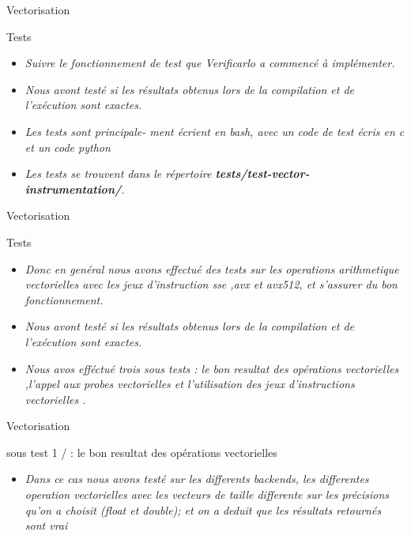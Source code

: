 \documentclass{beamer}
\begin{document}
\begin{frame}{Vectorisation}
\begin{block}{Tests}
    \begin{itemize}
        \item\textit{ Suivre le fonctionnement de test que
Verificarlo a commencé à implémenter. } 
         \item\textit{Nous avont testé si les résultats obtenus lors de la compilation et de l’exécution sont exactes.} 
        
         \item \textit{Les tests sont principale-
ment écrient en bash, avec un code de test écris en c et un code python}  
         \item \textit{Les tests se trouvent dans
le répertoire \textbf{ tests/test-vector-instrumentation/}.} 
         \end{itemize}  
\end{block}
\end{frame}


\begin{frame}{Vectorisation}
\begin{block}{Tests}
      \begin{itemize}
        \item\textit{Donc en genéral nous avons effectué des tests sur les operations arithmetique vectorielles avec les jeux d'instruction sse ,avx et avx512, et s'assurer du bon fonctionnement. } 
         \item\textit{Nous avont testé si les résultats obtenus lors de la compilation et de l’exécution sont exactes.} 
        
         \item \textit{Nous avos efféctué trois sous tests : le bon resultat des opérations vectorielles ,l'appel aux probes vectorielles et l'utilisation des jeux d'instructions vectorielles .}  
         
         \end{itemize}
\end{block}


         \end{frame}
\begin{frame}{Vectorisation} 
\begin{block}{sous test 1 / : le bon resultat des opérations vectorielles}
 \begin{itemize}
        \item\textit{Dans ce cas nous avons testé sur les differents backends, les differentes operation vectorielles avec les vecteurs de taille differente sur les précisions qu'on a choisit (float et double);
        et on a deduit que les résultats retournés sont vrai
        } 
        \end{itemize}   
\end{block}
\end{frame}
\end{document}
